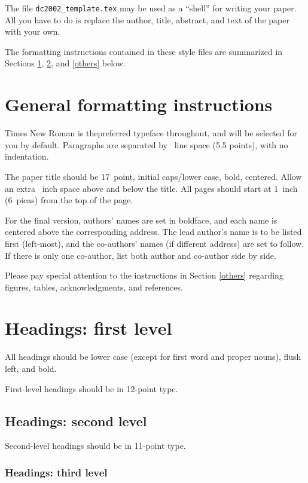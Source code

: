 \documentclass[11pt,a4paper]{article}
\begin{document}
The file \verb+dc2002_template.tex+ may be used as a ``shell'' for writing your
paper. All you have to do is replace the author, title, abstract, and text of
the paper with your own.

The formatting instructions contained in these style files are summarized in
Sections \ref{gen_inst}, \ref{headings}, and \ref{others} below.

\section{General formatting instructions}
\label{gen_inst}

Times New Roman is thepreferred typeface throughout, and will be selected for you by default.
Paragraphs are separated by ~line space (5.5 points), with no
indentation.

The paper title should be 17~point, initial caps/lower case, bold, centered. 
Allow an extra ~inch space above and
below the title. All pages should start at 1~inch (6~picas) from the
top of the page.

For the final version, authors' names are set in boldface, and each name is
centered above the corresponding address. The lead author's name is to be listed
first (left-most), and the co-authors' names (if different address) are set to
follow. If there is only one co-author, list both author and co-author side by
side.

Please pay special attention to the instructions in Section \ref{others}
regarding figures, tables, acknowledgments, and references.

\section{Headings: first level}
\label{headings}

All headings should be lower case (except for first word and proper nouns),
flush left, and bold.

First-level headings should be in 12-point type.

\subsection{Headings: second level}

Second-level headings should be in 11-point type.

\subsubsection{Headings: third level}
\end{document}
